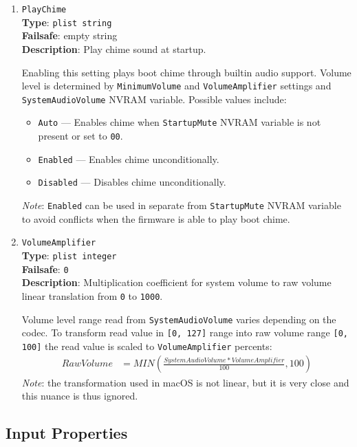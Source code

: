 \documentclass[]{article}
\providecommand{\tightlist}{%
  \setlength{\itemsep}{0pt}\setlength{\parskip}{0pt}}
\begin{document}
\begin{enumerate}
\item
  \texttt{PlayChime}\\
  \textbf{Type}: \texttt{plist\ string}\\
  \textbf{Failsafe}: empty string\\
  \textbf{Description}: Play chime sound at startup.

  Enabling this setting plays boot chime through builtin audio support. Volume level
  is determined by \texttt{MinimumVolume} and \texttt{VolumeAmplifier} settings and
  \texttt{SystemAudioVolume} NVRAM variable. Possible values include:

  \begin{itemize}
    \tightlist
    \item \texttt{Auto} --- Enables chime when \texttt{StartupMute} NVRAM variable
      is not present or set to \texttt{00}.
    \item \texttt{Enabled} --- Enables chime unconditionally.
    \item \texttt{Disabled} --- Disables chime unconditionally.
  \end{itemize}

  \emph{Note}: \texttt{Enabled} can be used in separate from \texttt{StartupMute}
  NVRAM variable to avoid conflicts when the firmware is able to play boot chime.

\item
  \texttt{VolumeAmplifier}\\
  \textbf{Type}: \texttt{plist\ integer}\\
  \textbf{Failsafe}: \texttt{0}\\
  \textbf{Description}: Multiplication coefficient for system volume to raw volume linear translation
  from \texttt{0} to \texttt{1000}.

  Volume level range read from \texttt{SystemAudioVolume} varies depending on the codec.
  To transform read value in \texttt{[0, 127]} range into raw volume range \texttt{[0, 100]}
  the read value is scaled to \texttt{VolumeAmplifier} percents:
  \begin{align*}
      RawVolume &= MIN(\frac{SystemAudioVolume * VolumeAmplifier}{100}, 100)
  \end{align*}
  \emph{Note}: the transformation used in macOS is not linear, but it is very close
  and this nuance is thus ignored.

\end{enumerate}

\subsection{Input Properties}\label{uefiinputprops}
\end{document}
